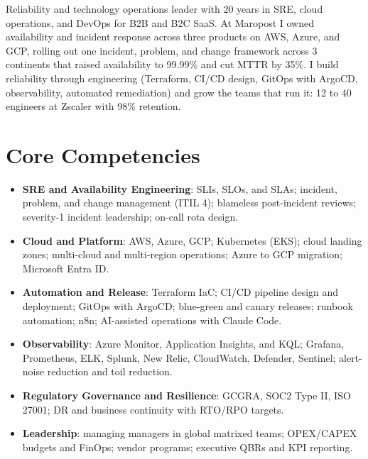 \documentclass[11pt,a4paper,sans]{moderncv}
\begin{document}
\makecvtitle


\vspace{6pt}
\small{Reliability and technology operations leader with 20 years in SRE, cloud operations, and DevOps for B2B and B2C SaaS. At Maropost I owned availability and incident response across three products on AWS, Azure, and GCP, rolling out one incident, problem, and change framework across 3 continents that raised availability to 99.99\% and cut MTTR by 35\%. I build reliability through engineering (Terraform, CI/CD design, GitOps with ArgoCD, observability, automated remediation) and grow the teams that run it: 12 to 40 engineers at Zscaler with 98\% retention.}


\section{Core Competencies}
\vspace{1pt}
\begin{itemize}

\item \textbf{SRE and Availability Engineering}: SLIs, SLOs, and SLAs; incident, problem, and change management (ITIL 4); blameless post-incident reviews; severity-1 incident leadership; on-call rota design.

\item \textbf{Cloud and Platform}: AWS, Azure, GCP; Kubernetes (EKS); cloud landing zones; multi-cloud and multi-region operations; Azure to GCP migration; Microsoft Entra ID.

\item \textbf{Automation and Release}: Terraform IaC; CI/CD pipeline design and deployment; GitOps with ArgoCD; blue-green and canary releases; runbook automation; n8n; AI-assisted operations with Claude Code.

\item \textbf{Observability}: Azure Monitor, Application Insights, and KQL; Grafana, Prometheus, ELK, Splunk, New Relic, CloudWatch, Defender, Sentinel; alert-noise reduction and toil reduction.

\item \textbf{Regulatory Governance and Resilience}: GCGRA, SOC2 Type II, ISO 27001; DR and business continuity with RTO/RPO targets.

\item \textbf{Leadership}: managing managers in global matrixed teams; OPEX/CAPEX budgets and FinOps; vendor programs; executive QBRs and KPI reporting.

\end{itemize}
\end{document}
